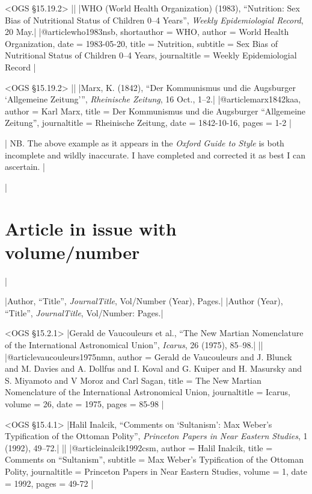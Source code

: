 \documentclass[extrafontsizes,11pt,a4paper,oneside]{memoir}
\begin{document}
\bibexample<OGS \S15.19.2>
||%
|WHO (World Health Organization) (1983), \enquote{Nutrition: Sex Bias of Nutritional Status of Children 0–4 Years}, \emph{Weekly Epidemiologial Record}, 20 May.|%
|@article{who1983nsb,
  shortauthor = {WHO},
  author = {{World Health Organization}},
  date = {1983-05-20},
  title = {Nutrition},
  subtitle = {Sex Bias of Nutritional Status of Children 0–4 Years},
  journaltitle = {Weekly Epidemiologial Record}
}|

\bibexample<OGS \S15.19.2>
||%
|Marx, K. (1842), \enquote{Der Kommunismus und die Augsburger \enquote{Allgemeine Zeitung}}, \emph{Rheinische Zeitung}, 16 Oct., 1–2.|%
|@article{marx1842kaa,
  author = {Karl Marx},
  title = {Der Kommunismus und die Augsburger \enquote{Allgemeine Zeitung}},
  journaltitle = {Rheinische Zeitung},
  date = {1842-10-16},
  pages = {1-2}
}|

\todoc[oxyear]|
NB. The above example as it appears in the \emph{Oxford Guide to Style} is both incomplete and wildly inaccurate.
I have completed and corrected it as best I can ascertain.
|

\todoc|
\section{Article in issue with volume/number}
|

\specs
|Author, \enquote{Title}, \emph{JournalTitle}, Vol/Number (Year), Pages.|%
|Author (Year), \enquote{Title}, \emph{JournalTitle}, Vol/Number: Pages.|

\bibexample<OGS \S15.2.1>
|Gerald de Vaucouleurs et al., \enquote{The New Martian Nomenclature of the International Astronomical Union}, \emph{Icarus}, 26 (1975), 85--98.|%
||%
|@article{vaucouleurs1975nmn,
  author = {Gerald de Vaucouleurs and J. Blunck and M. Davies and A. Dollfus and I. Koval and G. Kuiper and H. Masursky and S. Miyamoto and V Moroz and Carl Sagan},
  title = {The New {Martian} Nomenclature of the {International} {Astronomical} {Union}},
  journaltitle = {Icarus},
  volume = {26},
  date = {1975},
  pages = {85-98}
}|

\bibexample<OGS \S15.4.1>
|Halil Inalcik, \enquote{Comments on \enquote{Sultanism}: Max Weber's Typification of the Ottoman Polity}, \emph{Princeton Papers in Near Eastern Studies}, 1 (1992), 49--72.|%
||%
|@article{inalcik1992csm,
  author = {Halil Inalcik},
  title = {Comments on \enquote{Sultanism}},
  subtitle = {Max Weber's Typification of the Ottoman Polity},
  journaltitle = {Princeton Papers in Near Eastern Studies},
  volume = {1},
  date = {1992},
  pages = {49-72}
}|
\end{document}
